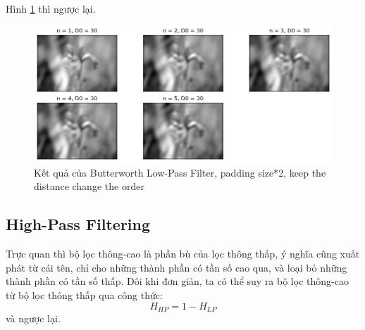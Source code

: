 \documentclass{article}
\begin{document}
        \phantom{a}\\
        Hình \ref{fig18} thì ngược lại.
        \begin{figure}[ht!]
        \centering
        \includegraphics[width = \linewidth]{fo17.png}
        \caption{Kết quả của Butterworth Low-Pass Filter, padding size*2, keep the distance change the order}
        \label{fig18}
        \end{figure}
        
        \newpage
        \phantom{a}
        \newpage
        \subsection{High-Pass Filtering}
        Trực quan thì bộ lọc thông-cao là phần bù của lọc thông thấp, ý nghĩa cũng xuất phát từ cái tên, chỉ cho những thành phần có tần số cao qua, và loại bỏ những thành phần có tần số thấp. Đôi khi đơn giản, ta có thể suy ra bộ lọc thông-cao từ bộ lọc thông thấp qua công thức:
        $$ H_{HP} = 1 - H_{LP}$$
        và ngược lại.
\end{document}
